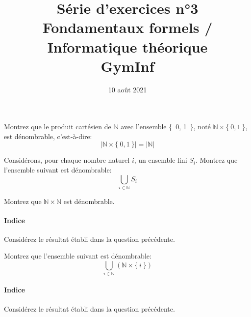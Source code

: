 \documentclass[12pt,french,a4paper]{article}
\begin{document}
\title{\vspace{-2cm}Série d'exercices n°3\\\large{Fondamentaux formels / Informatique théorique\\GymInf}}
\date{\vspace{-1cm}10 août 2021}

\maketitle

\begin{question}
Montrez que le produit cartésien de $\mathbb{N}$ avec l'ensemble \{\ 0, 1\ \}, noté $\mathbb{N} \times \{\ 0, 1\ \}$, est dénombrable, c'est-à-dire:
\[
|\mathbb{N} \times \{\ 0, 1\ \}| = |\mathbb{N}|
\]
\end{question}

\begin{question}
Considérons, pour chaque nombre naturel $i$, un ensemble fini $S_i$.
Montrez que l'ensemble suivant est dénombrable:
\[
\bigcup_{i \in \mathbb{N}} S_i
\]
\end{question}

\begin{question}
Montrez que $\mathbb{N} \times \mathbb{N}$ est dénombrable.

\paragraph{Indice} Considérez le résultat établi dans la question précédente.
\end{question}

\begin{question}
Montrez que l'ensemble suivant est dénombrable:
\[
\bigcup_{i \in \mathbb{N}} (\mathbb{N} \times \{\ i\ \})
\]

\paragraph{Indice} Considérez le résultat établi dans la question précédente.
\end{question}
\end{document}
